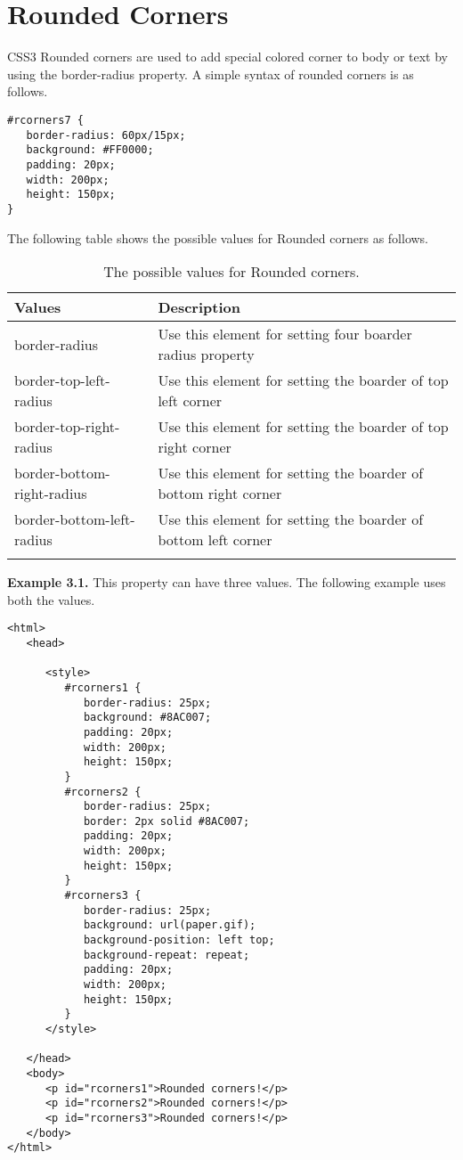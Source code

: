 \documentclass[a4paper,oneside]{book}
\numberwithin{equation}{chapter}
\begin{document}
\section{Rounded Corners}
CSS3 Rounded corners are used to add special colored corner to body or text by using the border-radius property. A simple syntax of rounded corners is as follows.
\begin{verbatim}
#rcorners7 {
   border-radius: 60px/15px;
   background: #FF0000;
   padding: 20px; 
   width: 200px;
   height: 150px; 
}
\end{verbatim}
The following table shows the possible values for Rounded corners as follows.
\begin{center}
\begin{longtable}{|l|p{7cm}|}
\hline
\textbf{Values} & \textbf{Description}\\
\hline
border-radius &	Use this element for setting four boarder radius property\\
\hline
border-top-left-radius & Use this element for setting the boarder of top left corner\\
\hline
border-top-right-radius & Use this element for setting the boarder of top right corner\\
\hline
border-bottom-right-radius & Use this element for setting the boarder of bottom right corner\\
\hline
border-bottom-left-radius & Use this element for setting the boarder of bottom left corner\\
\hline
\caption{The possible values for Rounded corners.}
\end{longtable}
\end{center}
\textbf{Example 3.1.} This property can have three values. The following example uses both the values.
\begin{verbatim}
<html>
   <head>
   
      <style>
         #rcorners1 {
            border-radius: 25px;
            background: #8AC007;
            padding: 20px;
            width: 200px;
            height: 150px;
         }
         #rcorners2 {
            border-radius: 25px;
            border: 2px solid #8AC007;
            padding: 20px; 
            width: 200px;
            height: 150px;
         }
         #rcorners3 {
            border-radius: 25px;
            background: url(paper.gif);
            background-position: left top;
            background-repeat: repeat;
            padding: 20px; 
            width: 200px;
            height: 150px;
         }
      </style>
      
   </head>
   <body>
      <p id="rcorners1">Rounded corners!</p>
      <p id="rcorners2">Rounded corners!</p>
      <p id="rcorners3">Rounded corners!</p>
   </body>
</html>
\end{verbatim}
\end{document}
